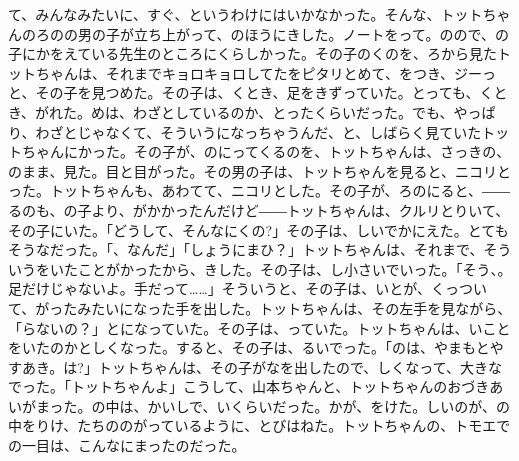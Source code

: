 て、みんなみたいに、すぐ、というわけにはいかなかった。そんな、トットちゃんのろのの男の子が立ち上がって、のほうにきした。ノートをって。のので、の子にかをえている先生のところにくらしかった。その子のくのを、ろから見たトットちゃんは、それまでキョロキョロしてたをピタリとめて、をつき、ジーっと、その子を見つめた。その子は、くとき、足をきずっていた。とっても、くとき、がれた。めは、わざとしているのか、とったくらいだった。でも、やっぱり、わざとじゃなくて、そういうになっちゃうんだ、と、しばらく見ていたトットちゃんにかった。その子が、のにってくるのを、トットちゃんは、さっきの、のまま、見た。目と目がった。その男の子は、トットちゃんを見ると、ニコリとった。トットちゃんも、あわてて、ニコリとした。その子が、ろのにると、――るのも、の子より、がかかったんだけど――トットちゃんは、クルリとりいて、その子にいた。「どうして、そんなにくの?」その子は、しいでかにえた。とてもそうなだった。「、なんだ」「しょうにまひ？」トットちゃんは、それまで、そういうをいたことがかったから、きした。その子は、し小さいでいった。「そう、。足だけじゃないよ。手だって……」そういうと、その子は、いとが、くっついて、がったみたいになった手を出した。トットちゃんは、その左手を見ながら、「らないの？」とになっていた。その子は、っていた。トットちゃんは、いことをいたのかとしくなった。すると、その子は、るいでった。「のは、やまもとやすあき。は?」トットちゃんは、その子がなを出したので、しくなって、大きなでった。「トットちゃんよ」こうして、山本ちゃんと、トットちゃんのおづきあいがまった。の中は、かいしで、いくらいだった。かが、をけた。しいのが、の中をりけ、たちののがっているように、とびはねた。トットちゃんの、トモエでの一目は、こんなにまったのだった。


